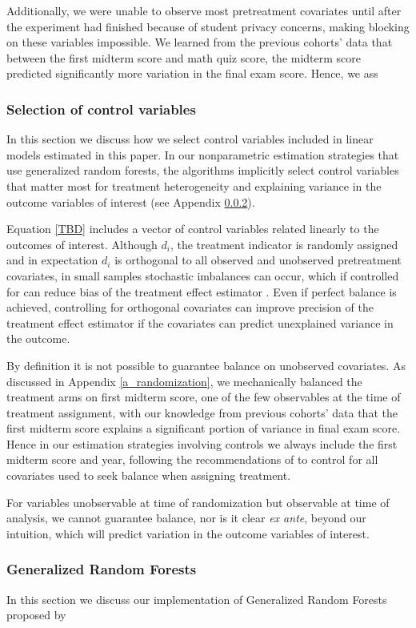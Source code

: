 \documentclass[12pt]{article}
\begin{document}
Additionally, we were unable to observe most pretreatment covariates until after the experiment had finished because of student privacy concerns, making blocking on these variables impossible. We learned from the previous cohorts' data that between the first midterm score and math quiz score, the midterm score predicted significantly more variation in the final exam score. Hence, we ass

\subsubsection{Selection of control variables} \label{a_selection}

In this section we discuss how we select control variables included in linear models estimated in this paper. In our nonparametric estimation strategies that use generalized random forests, the algorithms implicitly select control variables that matter most for treatment heterogeneity and explaining variance in the outcome variables of interest (see Appendix \ref{a_grf}).

Equation \ref{TBD} includes a vector of control variables related linearly to the outcomes of interest. Although $d_i$, the treatment indicator is randomly assigned and in expectation $d_i$ is orthogonal to all observed and unobserved pretreatment covariates, in small samples stochastic imbalances can occur, which if controlled for can reduce bias of the treatment effect estimator \parencite{ai2017}. Even if perfect balance is achieved, controlling for orthogonal covariates can improve precision of the treatment effect estimator if the covariates can predict unexplained variance in the outcome.

By definition it is not possible to guarantee balance on unobserved covariates. As discussed in Appendix \ref{a_randomization}, we mechanically balanced the treatment arms on first midterm score, one of the few observables at the time of treatment assignment, with our knowledge from previous cohorts' data that the first midterm score explains a significant portion of variance in final exam score. Hence in our estimation strategies involving controls we always include the first midterm score and year, following the recommendations of \textcite{bm2009} to control for all covariates used to seek balance when assigning treatment.

For variables unobservable at time of randomization but observable at time of analysis, we cannot guarantee balance, nor is it clear \textit{ex ante}, beyond our intuition, which will predict variation in the outcome variables of interest.

\subsubsection{Generalized Random Forests} \label{a_grf}

In this section we discuss our implementation of Generalized Random Forests proposed by \textcite{atw2019}
\end{document}
